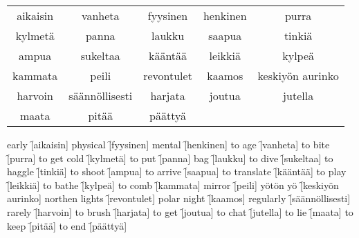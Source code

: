 \begin{center}
  \begin{tabular}{|c c c c c|}
    \hline
    aikaisin & vanheta & fyysinen & henkinen & purra \\
    kylmetä & panna & laukku & saapua & tinkiä \\
    ampua & sukeltaa & kääntää & leikkiä & kylpeä \\
    kammata & peili & revontulet & kaamos & keskiyön aurinko \\
    harvoin & säännöllisesti & harjata & joutua & jutella \\
    maata & pitää & päättyä && \\
    \hline
  \end{tabular}
\end{center}

\begin{questions}
  \begin{multicols}{3}
    \raggedcolumns
    \question early \f[aikaisin]
    \question physical \f[fyysinen]
    \question mental \f[henkinen]
    \question to age \f[vanheta]
    \question to bite \f[purra]
    \question to get cold \f[kylmetä]
    \question to put \f[panna]
    \question bag \f[laukku]
    \question to dive \f[sukeltaa]
    \question to haggle \f[tinkiä]
    \question to shoot  \f[ampua]
    \question to arrive \f[saapua]
    \question to translate \f[kääntää]
    \question to play \f[leikkiä]
    \question to bathe \f[kylpeä]
    \question to comb \f[kammata]
    \question mirror \f[peili]
    \question yötön yö \f[keskiyön aurinko]
    \question northen lights \f[revontulet]
    \question polar night    \f[kaamos]
    \question regularly      \f[säännöllisesti]
    \question rarely         \f[harvoin]
    \question to brush       \f[harjata]
    \question to get         \f[joutua]
    \question to chat        \f[jutella]
    \question to lie         \f[maata]
    \question to keep        \f[pitää]
    \question to end         \f[päättyä]
  \end{multicols}
\end{questions}
